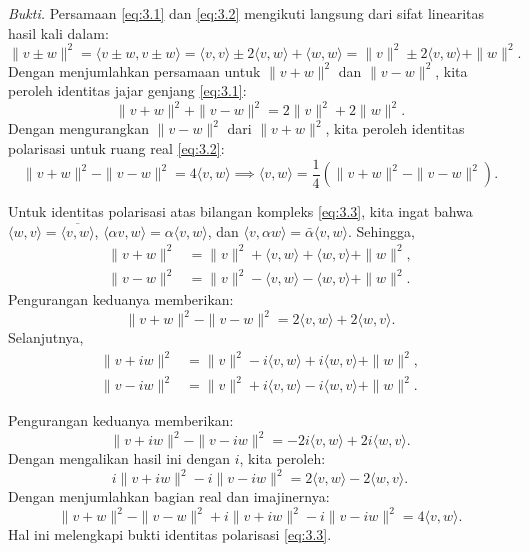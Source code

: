 \documentclass[aspectratio=169,11pt]{beamer}
\theoremstyle{definition}
\begin{document}
\begin{frame}[allowframebreaks]{\insertsection}{\insertsubsection}
  \textit{Bukti.}
  Persamaan \eqref{eq:3.1} dan \eqref{eq:3.2} mengikuti langsung dari sifat linearitas hasil kali dalam:
  \begin{equation*}
    \|v \pm w\|^2 = \langle v \pm w, v \pm w \rangle = \langle v,v \rangle \pm 2\langle v,w \rangle + \langle w,w \rangle = \|v\|^2 \pm 2\langle v,w \rangle + \|w\|^2.
  \end{equation*}
  Dengan menjumlahkan persamaan untuk $\|v+w\|^2$ dan $\|v-w\|^2$, kita peroleh identitas jajar genjang \eqref{eq:3.1}:
  \begin{equation*}
    \|v+w\|^2 + \|v-w\|^2 = 2\|v\|^2 + 2\|w\|^2.
  \end{equation*}
  Dengan mengurangkan $\|v-w\|^2$ dari $\|v+w\|^2$, kita peroleh identitas polarisasi untuk ruang real \eqref{eq:3.2}:
  \begin{equation*}
    \|v+w\|^2 - \|v-w\|^2 = 4\langle v,w \rangle \implies \langle v,w \rangle = \frac{1}{4}(\|v+w\|^2 - \|v-w\|^2).
  \end{equation*}
  \framebreak

  Untuk identitas polarisasi atas bilangan kompleks \eqref{eq:3.3}, kita ingat bahwa $\langle w, v \rangle = \overline{\langle v, w \rangle}$, $\langle \alpha v, w \rangle = \alpha \langle v, w \rangle$, dan $\langle v, \alpha w \rangle = \bar{\alpha} \langle v, w \rangle$. Sehingga,
  \begin{align*}
    \|v+w\|^2 & = \|v\|^2 + \langle v,w \rangle + \langle w,v \rangle + \|w\|^2, \\
    \|v-w\|^2 & = \|v\|^2 - \langle v,w \rangle - \langle w,v \rangle + \|w\|^2.
  \end{align*}
  Pengurangan keduanya memberikan:
  \begin{equation*}
    \|v+w\|^2 - \|v-w\|^2 = 2\langle v,w \rangle + 2\langle w,v \rangle.
  \end{equation*}
  Selanjutnya,
  \begin{align*}
    \|v+iw\|^2 & = \|v\|^2 - i\langle v,w \rangle + i\langle w,v \rangle + \|w\|^2, \\
    \|v-iw\|^2 & = \|v\|^2 + i\langle v,w \rangle - i\langle w,v \rangle + \|w\|^2.
  \end{align*}
  \framebreak

  Pengurangan keduanya memberikan:
  \begin{equation*}
    \|v+iw\|^2 - \|v-iw\|^2 = -2i\langle v,w \rangle + 2i\langle w,v \rangle.
  \end{equation*}
  Dengan mengalikan hasil ini dengan $i$, kita peroleh:
  \begin{equation*}
    i\|v+iw\|^2 - i\|v-iw\|^2 = 2\langle v,w \rangle - 2\langle w,v \rangle.
  \end{equation*}
  Dengan menjumlahkan bagian real dan imajinernya:
  \begin{equation*}
    \|v+w\|^2 - \|v-w\|^2 + i\|v+iw\|^2 - i\|v-iw\|^2 = 4\langle v,w \rangle.
  \end{equation*}
  Hal ini melengkapi bukti identitas polarisasi \eqref{eq:3.3}.
\end{frame}
\end{document}
